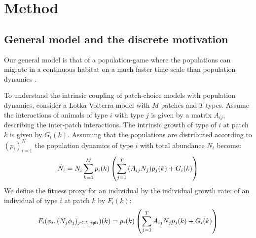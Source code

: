 \section{Method}


\subsection{General model and the discrete motivation}
\label{sec:gen_model}
Our general model is that of a population-game \citep{kvrivan2009evolutionary} where the populations can migrate in a continuous habitat on a much faster time-scale than population dynamics \citep{cressman2006migration, abrams2007role}.

To understand the intrinsic coupling of patch-choice models with population dynamics,
consider a Lotka-Volterra model with $M$ patches and $T$ types. Assume the interactions of animals of type $i$ with type $j$ is given by a matrix $A_{ij}$, describing the inter-patch interactions. The intrinsic growth of type of $i$ at patch $k$ is given by $G_{i}(k)$. Assuming that the populations are distributed according to $(p_i)_{i=1}^N$ the population dynamics of type $i$ with total abundance $N_i$ become:
  \begin{equation}
  \dot{N}_i = N_i \sum_{k=1}^M p_i(k) \pa{\sum_{j=1}^T {(A_{ij}N_j) p_j}(k) + G_i(k)} %
  \label{eq:pop_dyn_lv}
\end{equation}
We define the fitness proxy for an individual by the individual growth rate:
of an individual of type $i$ at patch $k$ by $F_i(k)$:
\begin{equation}
  F_i(\phi_i, (N_j \phi_j)_{j \leq T, j \neq i})(k) = p_i(k) \pa{\sum_{j=1}^T {A_{ij}N_j p_j}(k) + G_{i}(k)} %
  \label{eq:utility_pm}
\end{equation}
